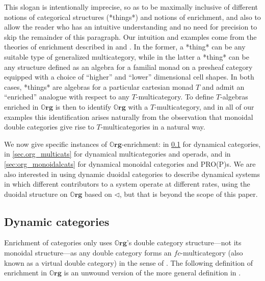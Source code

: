 \documentclass{eptcs}
\theoremstyle{definition}
\theoremstyle{plain}
\newcommand{\Cat}[1]{\textbf{#1}}%
\newcommand{\0}{\textsf{0}}
\newcommand{\1}{\tn{\textsf{1}}}
\newcommand{\tri}{\mathbin{\triangleleft}}
\newcommand{\org}{{\mathbb{O}\Cat{rg}}}
\begin{document}
This slogan is intentionally imprecise, so as to be maximally inclusive of different notions of categorical structures  (*things*) and notions of enrichment, and also to allow the reader who has an intuitive understanding and no need for precision to skip the remainder of this paragraph. Our intuition and examples come from the theories of enrichment described in \cite{leinster1999generalized} and \cite{shapiro2022enrichment}. In the former, a *thing* can be any suitable type of generalized multicategory, while in the latter a *thing* can be any structure defined as an algebra for a familial monad on a presheaf category equipped with a choice of ``higher'' and ``lower'' dimensional cell shapes. In both cases, *things* are algebras for a particular cartesian monad $T$ and admit an ``enriched'' analogue with respect to any $T$-multicategory. To define $T$-algebras enriched in $\org$ is then to identify $\org$ with a $T$-multicategory, and in all of our examples this identification arises naturally from the observation that monoidal double categories give rise to $T$-multicategories in a natural way.

We now give specific instances of $\org$-enrichment: in \cref{sec.org_cats} for dynamical categories, in \cref{sec.org_multicats} for dynamical multicategories and operads, and in \cref{sec:org_monoidalcats} for dynamical monoidal categories and PRO(P)s. We are also interested in using dynamic duoidal categories to describe dynamical systems in which different contributors to a system operate at different rates, using the duoidal structure on $\org$ based on $\tri$, but that is beyond the scope of this paper.


\subsection{Dynamic categories}\label{sec.org_cats}


Enrichment of categories only uses $\org$'s double category structure---not its monoidal structure---as any double category forms an $f\!c$-multicategory (also known as a virtual double category) in the sense of \cite[Section 2.1]{leinster1999generalized}. 
The following definition of enrichment in $\org$ is an unwound version of the more general definition in \cite[Section 2.2]{leinster1999generalized}.
\end{document}

